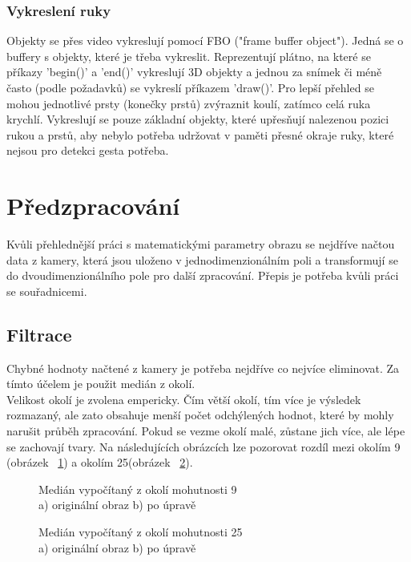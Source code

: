 \subsubsection{Vykreslení ruky}
Objekty se přes video vykreslují pomocí FBO ("frame buffer object"). Jedná se o buffery s objekty, které je třeba vykreslit. Reprezentují plátno, na které se příkazy 'begin()' a 'end()' vykreslují 3D objekty a jednou za snímek či méně často (podle požadavků) se vykreslí příkazem 'draw()'. Pro lepší přehled se mohou jednotlivé prsty (konečky prstů) zvýraznit koulí, zatímco celá ruka krychlí. Vykreslují se pouze základní objekty, které upřesňují nalezenou pozici rukou a prstů, aby nebylo potřeba udržovat v paměti přesné okraje ruky, které nejsou pro detekci gesta potřeba.

\section{Předzpracování}

Kvůli přehlednější práci s matematickými parametry obrazu se nejdříve načtou data z kamery, která jsou uloženo v jednodimenzionálním poli a transformují se do dvoudimenzionálního pole pro další zpracování. Přepis je potřeba kvůli práci se souřadnicemi.\\

\subsection{Filtrace}
Chybné hodnoty načtené z kamery je potřeba nejdříve co nejvíce eliminovat. Za tímto účelem je použit medián z okolí.\\

Velikost okolí je zvolena empericky. Čím větší okolí, tím více je výsledek rozmazaný, ale zato obsahuje menší počet odchýlených hodnot, které by mohly narušit průběh zpracování. Pokud se vezme okolí malé, zůstane jich více, ale lépe se zachovají tvary. Na následujících obrázcích lze pozorovat rozdíl mezi okolím 9 (obrázek ~\ref{pic10}) a okolím 25(obrázek ~\ref{pic11}).\\

\begin{figure}[htp]
\centering
{} \hfil
{}
\caption{Medián vypočítaný z okolí mohutnosti 9 \\ a) originální obraz b) po úpravě}
\label{pic10}
\end{figure}
\begin{figure}[htp]
\centering
{} \hfil
{}
\caption{Medián vypočítaný z okolí mohutnosti 25 \\ a) originální obraz b) po úpravě}
\label{pic11}
\end{figure}

